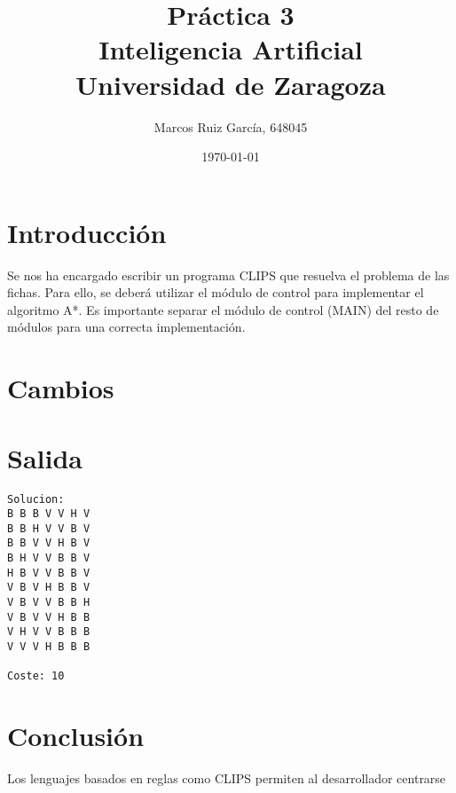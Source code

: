 \documentclass[a4paper]{article}
\title{Práctica 3 \\ Inteligencia Artificial \\ \large Universidad de Zaragoza}
\author{Marcos Ruiz García, 648045}
\date{\today}
\begin{document}
\maketitle

\tableofcontents

\section{Introducción}
Se nos ha encargado escribir un programa CLIPS que resuelva el problema de las fichas. Para ello, se deberá utilizar el módulo de control para implementar el algoritmo A*. Es importante separar el módulo de control (MAIN) del resto de módulos para una correcta implementación.

\section{Cambios}

\section{Salida}
\begin{lstlisting}
Solucion:
B B B V V H V
B B H V V B V
B B V V H B V
B H V V B B V
H B V V B B V
V B V H B B V
V B V V B B H
V B V V H B B
V H V V B B B
V V V H B B B

Coste: 10
\end{lstlisting}

\section{Conclusión}
Los lenguajes basados en reglas como CLIPS permiten al desarrollador centrarse 
\end{document}
